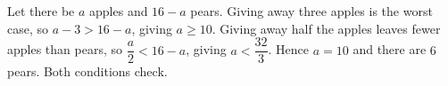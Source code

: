 Let there be $a$ apples and $16-a$ pears. Giving away three apples is the worst case, so $a-3>16-a$, giving $a\ge10$. Giving away half the apples leaves fewer apples than pears, so $\dfrac{a}{2}<16-a$, giving $a<\dfrac{32}{3}$. Hence $a=10$ and there are $\boxed6$ pears. Both conditions check.
